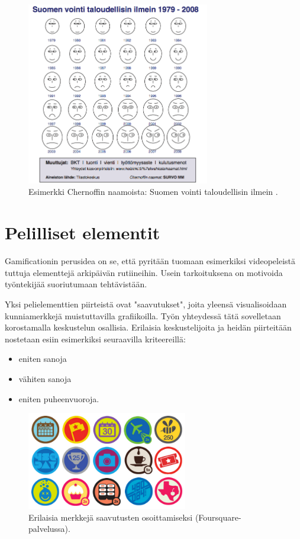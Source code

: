 \documentclass[11pt,a4paper,oneside]{memoir}
\begin{document}
\begin{figure}[H]
  \centering
  \includegraphics[width=8cm]{suomen-vointi-chernoff}
  \caption{Esimerkki Chernoffin naamoista: Suomen vointi taloudellisin ilmein \cite{helsinki:chernoffin-naamat}.}
  \label{fig:suomen-vointi-chernoff}
\end{figure}

\section{Pelilliset elementit}
Gamificationin perusidea on se, että pyritään tuomaan esimerkiksi videopeleistä tuttuja elementtejä arkipäivän rutiineihin. Usein tarkoituksena on motivoida työntekijää suoriutumaan tehtävistään.

Yksi pelielementtien piirteistä ovat "saavutukset", joita yleensä visualisoidaan kunniamerkkejä muistuttavilla grafiikoilla. Työn yhteydessä tätä sovelletaan korostamalla keskustelun osallisia. Erilaisia keskustelijoita ja heidän piirteitään nostetaan esiin esimerkiksi seuraavilla kriteereillä:
\begin{itemize}
\item{eniten sanoja}
\item{vähiten sanoja}
\item{eniten puheenvuoroja.}
\end{itemize}

\begin{figure}[H]
  \centering
  \includegraphics[width=7cm]{foursquare-kunniamerkit}
  \caption{Erilaisia merkkejä saavutusten osoittamiseksi (Foursquare-palvelussa).}
  \label{fig:foursquare-merkit}
\end{figure}
\end{document}
